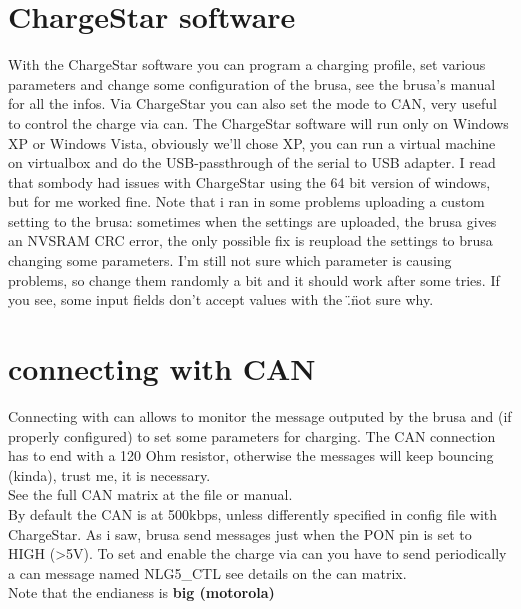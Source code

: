 \documentclass[a4paper]{report}
\begin{document}
  \section{ChargeStar software}
  With the ChargeStar software you can program a charging profile, set various parameters and change some configuration of the brusa, see the brusa's manual for all the infos. Via ChargeStar you can also set the mode to CAN, very useful to control the charge via can.
  The ChargeStar software will run only on Windows XP or Windows Vista, obviously we'll chose XP, you can run a virtual machine on virtualbox and do the USB-passthrough of the serial to USB adapter. I read that sombody had issues with ChargeStar using the 64 bit version of windows, but for me worked fine.
  Note that i ran in some problems uploading a custom setting to the brusa: sometimes when the settings are uploaded, the brusa gives an NVSRAM CRC error, the only possible fix is reupload the settings to brusa changing some parameters. I'm still not sure which parameter is causing problems, so change them randomly a bit and it should work after some tries. If you see, some input fields don't accept values with the \".\" not sure why.\\


  \section{connecting with CAN}
  Connecting with can allows to monitor the message outputed by the brusa and (if properly configured) to set some parameters for charging.
  The CAN connection has to end with a 120 Ohm resistor, otherwise the messages will keep bouncing (kinda), trust me, it is necessary.\\
  See the full CAN matrix at the file or manual.\\
  By default the CAN is at 500kbps, unless differently specified in config file with ChargeStar.
  As i saw, brusa send messages just when the PON pin is set to HIGH (>5V).
  To set and enable the charge via can you have to send periodically a can message named NLG5\_CTL see details on the can matrix.\\
  Note that the endianess is \textbf{big (motorola)}
\end{document}
